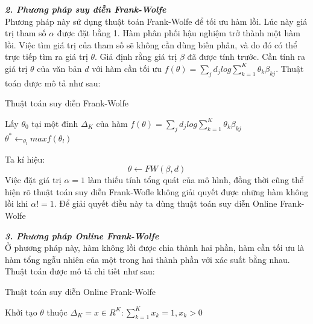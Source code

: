 \documentclass[fontsize=13pt]{scrartcl}
\begin{document}
\par
\textbf{\textit{2. Phương pháp suy diễn Frank-Wolfe}}\\
Phương pháp này sử dụng thuật toán Frank-Wolfe để tối ưu hàm lồi. Lúc này giá trị tham số $\alpha$ được đặt bằng 1. Hàm phân phối hậu nghiệm trở thành một hàm lồi. Việc tìm giá trị của tham số sẽ không cần dùng biến phân, và do đó có thể trực tiếp tìm ra giá trị $\theta$. Giả định rằng giá trị $\beta$ đã được tính trước. Cần tính ra giá trị $\theta$ của văn bản $d$ với hàm cần tối ưu $f(\theta)= \sum_{j}d_{j}log\sum_{k=1}^{K}\theta_{k}\beta_{kj}$. Thuật toán được mô tả như sau:
\begin{algorithm}[H]
\begin{algorithmic}
\caption{Thuật toán suy diễn Frank-Wolfe}
\label{frankwolfeInfer2}
\ENSURE{$\theta$\\}
Lấy $\theta_0$ tại một đỉnh $\Delta_K$ của hàm  $f(\theta)= \sum_{j}d_{j}log\sum_{k=1}^{K}\theta_{k}\beta_{kj}$ \\
\ENDFOR
\STATE $\theta^{*} \leftarrow _{\theta_l} max f(\theta_l)$
\end{algorithmic}
\end{algorithm}
Ta kí hiệu:
\begin{equation}
	\theta \leftarrow FW(\beta,d)
\end{equation} 
Việc đặt giá trị $\alpha = 1$ làm thiếu tính tổng quát của mô hình, đồng thời cũng thể hiện rõ thuật toán suy diễn Frank-Wofle không giải quyết được những hàm không lồi khi $\alpha != 1$. Để giải quyết điều này ta dùng thuật toán suy diễn Online Frank-Wolfe
\par
\textbf{\textit{3. Phương pháp Online Frank-Wolfe}}\\
Ở phương pháp này, hàm không lồi được chia thành hai phần, hàm cần tối ưu là hàm tổng ngẫu nhiên của một trong hai thành phần với xác suất bằng nhau. Thuật toán được mô tả chi tiết như sau:
\begin{algorithm}[H]
\begin{algorithmic}
\caption{Thuật toán suy diễn Online Frank-Wolfe}
\label{onlfrankwolfeInfer}
\ENSURE{$\theta$\\}
Khởi tạo $\theta$ thuộc $\Delta_{K} = {x \in R^{K} : \sum_{k=1}^{K} x_k = 1, x_k>0}$
\\
\\
\ENDFOR
\end{algorithmic}
\end{algorithm}
\end{document}
